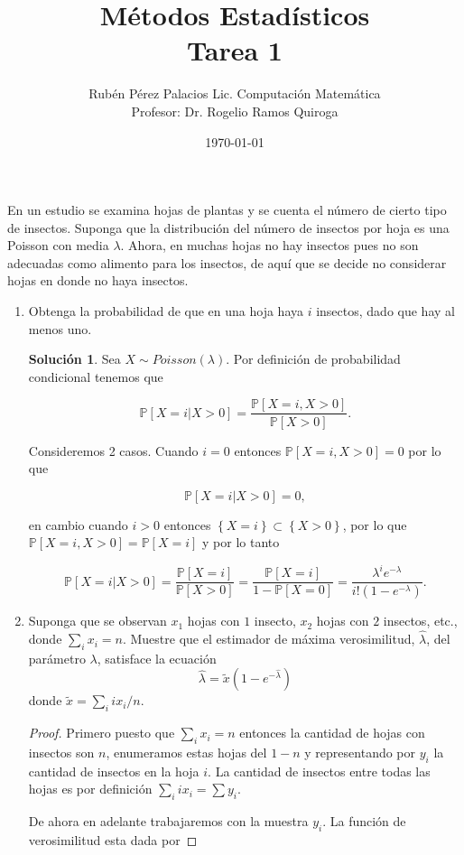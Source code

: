 \documentclass[letterpaper]{article}
\title{Métodos Estadísticos \\ Tarea 1}
\author{Rubén Pérez Palacios Lic. Computación Matemática\\Profesor: Dr. Rogelio Ramos Quiroga}
\date{\today}
\theoremstyle{definition}
\theoremstyle{lemathm}
\theoremstyle{lemathm}
\newtheorem{sol}{Solución}
\theoremstyle{lemathm}
\theoremstyle{lemademthm}
\newcommand{\pars}[1]{\left( #1 \right) }
\newcommand{\bracs}[1]{\left[ #1 \right] }
\newcommand{\set}[1]{\left \{ #1 \right\} }
\newcommand{\PP}{\mathbb{P}}
\newcommand{\1}{\mathbbm{1}}
\begin{document}
	\maketitle
	En un estudio se examina hojas de plantas y se cuenta el número de cierto tipo de insectos. Suponga que la distribución del número de insectos por hoja es una Poisson con media $\lambda$. Ahora, en muchas hojas no hay insectos pues no son adecuadas como alimento para los insectos, de aquí que se decide no considerar hojas en donde no haya insectos.
	\begin{enumerate}
		\item Obtenga la probabilidad de que en una hoja haya $i$ insectos, dado que hay al menos uno.
		
		\begin{sol}
			Sea $X\sim Poisson\pars{\lambda}$. Por definición de probabilidad condicional tenemos que

			\[\PP\bracs{X = i| X > 0} = \frac{\PP\bracs{X = i, X > 0}}{\PP\bracs{X > 0}}.\]

			Consideremos 2 casos. Cuando $i = 0$ entonces $\PP\bracs{X = i, X > 0} = 0$ por lo que 

			\[\PP\bracs{X = i| X > 0} = 0,\]

			en cambio cuando $i > 0$ entonces $\set{X = i} \subset \set{X > 0}$, por lo que $\PP\bracs{X = i, X > 0} = \PP\bracs{X = i}$ y por lo tanto

			\[\PP\bracs{X = i| X > 0} = \frac{\PP\bracs{X = i}}{\PP\bracs{X > 0}} = \frac{\PP\bracs{X = i}}{1-\PP\bracs{X = 0}} = \frac{\lambda^{i}e^{-\lambda}}{i! \pars{1-e^{-\lambda}}}.\]


		\end{sol}
		\item Suponga que se observan $x_1$ hojas con $1$ insecto, $x_2$ hojas con $2$ insectos, etc., donde $\sum_{i} x_{i} = n$. Muestre que el estimador de máxima verosimilitud, $\hat{\lambda}$, del parámetro $\lambda$, satisface la ecuación
		\[\hat{\lambda} = \tilde{x}\pars{1-e^{-\hat{\lambda}}}\]
		donde $\tilde{x} = \sum_{i} ix_i/n$.

		\begin{proof}
			Primero puesto que $\sum_{i} x_{i} = n$ entonces la cantidad de hojas con insectos son $n$, enumeramos estas hojas del $1-n$ y representando por $y_{i}$ la cantidad de insectos en la hoja $i$. La cantidad de insectos entre todas las hojas es por definición $\sum_{i} ix_{i} = \sum y_{i}$.

			De ahora en adelante trabajaremos con la muestra $y_{i}$. La función de verosimilitud esta dada por


\end{proof}
\end{enumerate}
\end{document}

